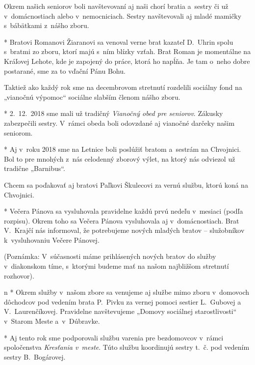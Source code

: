Okrem našich seniorov boli navštevovaní aj naši chorí bratia a~sestry či už v~domácnostiach alebo v~nemocniciach. Sestry navštevovali aj mladé mamičky s~bábätkami z~nášho zboru.

* 
Bratovi Romanovi Žiaranovi sa venoval verne brat kazateľ D.~Uhrin spolu s~bratmi zo zboru, ktorí majú s~ním blízky vzťah. Brat Roman je momentálne na Kráľovej Lehote, kde je zapojený do práce, ktorá ho napĺňa. Je tam o~neho dobre postarané, sme za to vďační Pánu Bohu.

Taktiež ako každý rok sme na decembrovom stretnutí rozdelili sociálny fond na „vianočnú výpomoc“ sociálne slabším členom nášho zboru.

* 
 2.~12.~2018 sme mali už tradičný {\it Vianočný obed pre seniorov}. Zákusky zabezpečili sestry. V~rámci obeda boli odovzdané aj vianočné darčeky našim seniorom.

* 
Aj v~roku 2018 sme na Letnice boli poslúžiť bratom a~sestrám na Chvojnici. Bol to pre mnohých z~nás celodenný zborový výlet, na ktorý nás odviezol už tradične „Barnibus“.

Chcem sa poďakovať aj bratovi Paľkovi Škulecovi za vernú službu, ktorú koná na Chvojnici.

* 
Večera Pánova sa vysluhovala pravidelne každú prvú nedeľu v~mesiaci (podľa rozpisu). Okrem toho sa Večera Pánova vysluhovala aj v~domácnostiach. Brat V.~Krajčí nás informoval, že potrebujeme nových mladých bratov -- služobníkov k~vysluhovaniu Večere Pánovej.

(Poznámka: V~súčasnosti máme prihlásených nových bratov do služby v~diakonskom tíme, s~ktorými budeme mať na našom najbližšom stretnutí rozhovor).
\enditems


\begitems \style n
* 
Okrem služby v~našom zbore sa venujeme aj službe mimo zboru v~domovoch dôchodcov pod vedením brata P.~Pivku za vernej pomoci sestier L.~Gubovej a V.~Laurenčíkovej. Pravidelne navštevujeme „Domovy sociálnej starostlivosti“ v~Starom Meste a~v~Dúbravke.

* 
Aj tento rok sme podporovali službu varenia pre bezdomovcov v~rámci spoločenstva {\it Kresťania v~meste}. Túto službu koordinujú sestry t.~č. pod vedením sestry B.~Bogárovej.
\enditems


